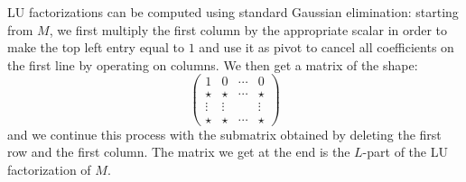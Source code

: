 \documentclass[11pt]{article}
\numberwithin{equation}{section}
\numberwithin{figure}{section}
\theoremstyle{definition}
\begin{document}
LU factorizations can be computed using standard Gaussian elimination: 
starting from $M$, we first multiply the first column by the appropriate 
scalar in order to make the top left entry equal to $1$ and use it as 
pivot to cancel all coefficients on the first line by operating on 
columns. We then get a matrix of the shape:
$$\left(\begin{matrix}
1 & 0 & \cdots & 0 \\
\star & \star & \cdots & \star \\
\vdots & \vdots & & \vdots \\
\star & \star & \cdots & \star 
\end{matrix}\right)$$
and we continue this process with the submatrix obtained by deleting
the first row and the first column. The matrix we get at the end is
the $L$-part of the LU factorization of $M$.
\end{document}
